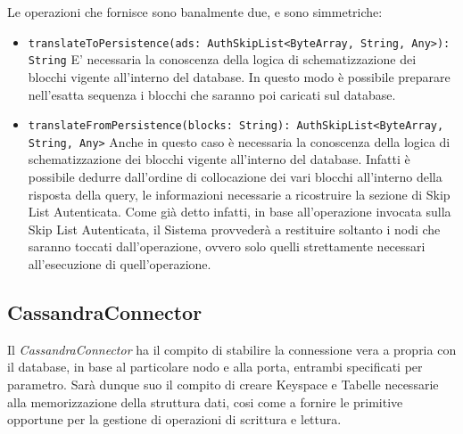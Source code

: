 		Le operazioni che fornisce sono banalmente due, e sono simmetriche:
		\begin{itemize}
			\item \verb!translateToPersistence(ads: AuthSkipList<ByteArray, String, Any>): String! E' necessaria la conoscenza della logica di schematizzazione dei blocchi vigente all'interno del database. In questo modo è possibile preparare nell'esatta sequenza	i blocchi che saranno poi caricati sul database.
			\item \verb!translateFromPersistence(blocks: String): AuthSkipList<ByteArray, String, Any>! Anche in questo caso è necessaria la conoscenza della logica di schematizzazione dei blocchi vigente all'interno del database. Infatti è possibile dedurre dall'ordine di collocazione dei vari blocchi all'interno della risposta della query, le informazioni necessarie a ricostruire la sezione di Skip List Autenticata. Come già detto infatti, in base all'operazione invocata sulla Skip List Autenticata, il Sistema provvederà a restituire soltanto i nodi che saranno toccati dall'operazione, ovvero solo quelli strettamente necessari all'esecuzione di quell'operazione.
		\end{itemize}
		
	\subsection{CassandraConnector}
	

		Il \textit{CassandraConnector} ha il compito di stabilire la connessione vera a propria con il database, in base al particolare nodo e alla porta, entrambi specificati per parametro. Sarà dunque suo il compito di creare Keyspace e Tabelle necessarie alla memorizzazione della struttura dati, cosi come a fornire le primitive opportune per la gestione di operazioni di scrittura e lettura.
		
